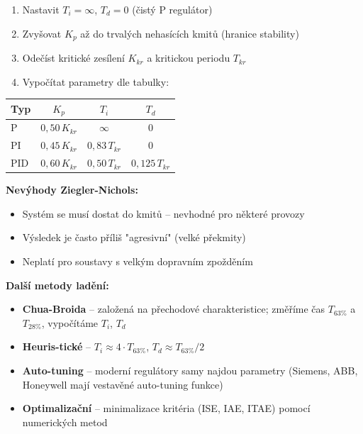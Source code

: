 \documentclass[a4paper,10pt]{article}
\begin{document}
\begin{vysvetlenibox}
\begin{enumerate}[noitemsep, leftmargin=1.4em, topsep=4pt]
    \item Nastavit $T_i = \infty$, $T_d = 0$ (čistý P regulátor)
    \item Zvyšovat $K_p$ až do trvalých nehasících kmitů (hranice stability)
    \item Odečíst kritické zesílení $K_{kr}$ a kritickou periodu $T_{kr}$
    \item Vypočítat parametry dle tabulky:
\end{enumerate}

\begin{center}
\begin{tabular}{@{} l c c c @{}}
    \toprule
    \textbf{Typ} & $K_p$ & $T_i$ & $T_d$ \\
    \midrule
    P   & $0{,}50\,K_{kr}$ & $\infty$ & $0$ \\
    PI  & $0{,}45\,K_{kr}$ & $0{,}83\,T_{kr}$ & $0$ \\
    PID & $0{,}60\,K_{kr}$ & $0{,}50\,T_{kr}$ & $0{,}125\,T_{kr}$ \\
    \bottomrule
\end{tabular}
\end{center}

\textbf{Nevýhody Ziegler-Nichols:}
\begin{itemize}[noitemsep, leftmargin=1.4em, topsep=4pt]
    \item Systém se musí dostat do kmitů -- nevhodné pro některé provozy
    \item Výsledek je často příliš "agresivní" (velké překmity)
    \item Neplatí pro soustavy s velkým dopravním zpožděním
\end{itemize}

\textbf{Další metody ladění:}
\begin{itemize}[noitemsep, leftmargin=1.4em, topsep=4pt]
    \item \textbf{Chua-Broida} -- založená na přechodové charakteristice;
          změříme čas $T_{63\%}$ a $T_{28\%}$, vypočítáme $T_i$, $T_d$
    \item \textbf{Heuris-tické} -- $T_i \approx 4 \cdot T_{63\%}$, $T_d \approx T_{63\%} / 2$
    \item \textbf{Auto-tuning} -- moderní regulátory samy najdou parametry
          (Siemens, ABB, Honeywell mají vestavěné auto-tuning funkce)
    \item \textbf{Optimalizační} -- minimalizace kritéria (ISE, IAE, ITAE)
          pomocí numerických metod
\end{itemize}


\end{vysvetlenibox}
\end{document}
